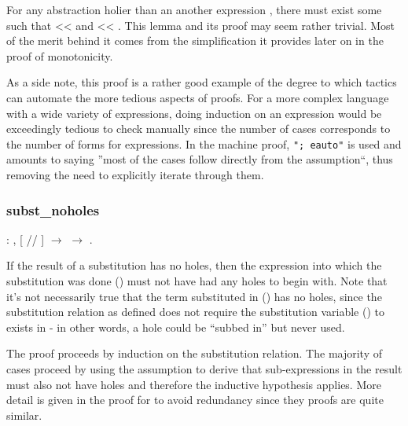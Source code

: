 \documentclass[12pt]{report}
\begin{document}
For any abstraction   
 holier than an another expression ,
there must exist some  such that  <<
 and   
 <<   
. This lemma and its proof may seem rather trivial.
Most of the merit behind it comes from the simplification it provides
later on in the proof of monotonicity.


As a side note, this proof is a rather good example of the degree to
which tactics can automate the more tedious aspects of proofs. For
a more complex language with a wide variety of expressions, doing
induction on an expression would be exceedingly tedious to check
manually since the number of cases corresponds to the number of forms
for expressions. In the machine proof, \texttt{"; eauto"} is used and
amounts to saying ''most of the cases follow directly from the
assumption``, thus removing the need to explicitly iterate through
them. 

\subsubsection{subst\_noholes}

\begin{coqdoccode}
\coqdocemptyline
\coqdocindent{1.00em}
  : \coqdockw{\ensuremath{\forall}}    ,\coqdoceol
\coqdocindent{2.00em}
[  //  ]    \ensuremath{\rightarrow}\coqdoceol
\coqdocindent{2.00em}
  \ensuremath{\rightarrow}\coqdoceol
\coqdocindent{2.00em}
 .\coqdoceol
\coqdocemptyline
\end{coqdoccode}

If the result of a substitution has no holes, then the expression
into which the substitution was done () must not have
had any holes to begin with. Note that it's not necessarily true that
the term substituted in () has no holes, since the
substitution relation as defined does not require the substitution
variable () to exists in  - in other
words, a hole could be ``subbed in'' but never used.


The proof proceeds by induction on the substitution relation. The
majority of cases proceed by using the  assumption
to derive that sub-expressions in the result must also not have holes
and therefore the inductive hypothesis applies. More detail is given
in the proof for  to avoid
redundancy since they proofs are quite similar. 
\end{document}
